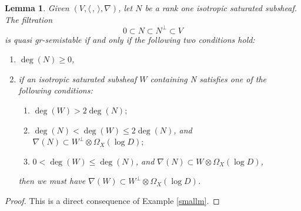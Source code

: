 \documentclass[JEP,XML,SOM,Unicode,published]{cedram}
\newcommand{\grsemistable}{gr\nobreakdash-semi\-stable\xspace}
\theoremstyle{plain}
\newtheorem{lem}[thm]{Lemma}
\theoremstyle{definition}
\begin{document}
\begin{lem}\label{criterion}
Given $(V,\langle \,, \, \rangle,\nabla)$, let $N$ be a rank one isotropic saturated subsheaf. The filtration
\[
0\subset N\subset N^\perp\subset V
\]
is quasi \grsemistable if and only if the following two conditions hold:
\begin{enumerate}
\item $\deg(N)\geq 0$,

\item if an isotropic saturated subsheaf $W$ containing N satisfies one of the following conditions:
\begin{enumerate}
\item $\deg(W)>2\deg(N);$

\item $\deg(N)<\deg(W)\leq2\deg(N)$, and $\nabla(N)\subset W^\perp\otimes \Omega_X(\log D);$

\item $0<\deg(W)\leq \deg(N)$, and $\nabla(N)\subset W\otimes \Omega_X(\log D)$,
\end{enumerate}
then we must have $\nabla(W)\subset W^\perp\otimes \Omega_X(\log D)$.
\end{enumerate}
\end{lem}

\begin{proof} 
This is a direct consequence of Example \ref{smallm}.
\end{proof}
\end{document}

